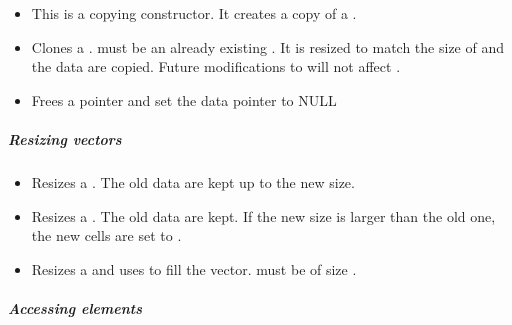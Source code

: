 \begin{itemize}
\item {}
  \sshortdescribe This is a copying constructor. It creates a copy of a .
\item {} 
  \sshortdescribe Clones a .  must be an
  already existing  . It is resized to match the size of
   and the data are copied. Future modifications to  will not
  affect .

\item {}
  \sshortdescribe Frees a  pointer and set the data pointer to NULL  
\end{itemize}

\subparagraph{Resizing vectors}
\begin{itemize}
\item {}
  \sshortdescribe Resizes a . The old data are kept up to
  the new size.
\item {} 
  \sshortdescribe Resizes a .  The old data are kept. If
  the new size is larger than the old one, the new cells are set to .
\item {} 
  \sshortdescribe Resizes a  and uses  to fill the
  vector.  must be of size .
\end{itemize}  

\subparagraph{Accessing elements}

